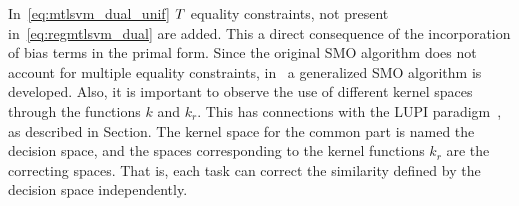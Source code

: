 In~\eqref{eq:mtlsvm_dual_unif} $T$ equality constraints, not present in~\eqref{eq:regmtlsvm_dual} are added. This a direct consequence of the incorporation of bias terms in the primal form. Since the original SMO algorithm does not account for multiple equality constraints, in~\cite{CaiC12} a generalized SMO algorithm is developed.
Also, it is important to observe the use of different kernel spaces through the functions $k$ and $k_r$.
This has connections with the LUPI paradigm~\cite{VapnikI15a}, as described in Section. The kernel space for the common part is named the decision space, and the spaces corresponding to the kernel functions $k_r$ are the correcting spaces. That is, each task can correct the similarity defined by the decision space independently.


